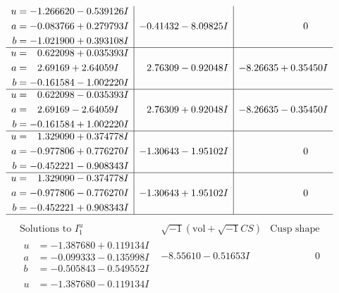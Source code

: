\documentclass[1p]{elsarticle_modified}
\theoremstyle{definition}
\newcommand{\I}{\sqrt{-1}}
\begin{document}
$$\begin{array}{c|c|c}
\begin{aligned}
u &= -1.266620 - 0.539126 I \\
a &= -0.083766 + 0.279793 I \\
b &= -1.021900 + 0.393108 I\end{aligned}
 & -0.41432 - 8.09825 I & \phantom{-0.000000 } 0 \\ \hline\begin{aligned}
u &= \phantom{-}0.622098 + 0.035393 I \\
a &= \phantom{-}2.69169 + 2.64059 I \\
b &= -0.161584 - 1.002220 I\end{aligned}
 & \phantom{-}2.76309 - 0.92048 I & -8.26635 + 0.35450 I \\ \hline\begin{aligned}
u &= \phantom{-}0.622098 - 0.035393 I \\
a &= \phantom{-}2.69169 - 2.64059 I \\
b &= -0.161584 + 1.002220 I\end{aligned}
 & \phantom{-}2.76309 + 0.92048 I & -8.26635 - 0.35450 I \\ \hline\begin{aligned}
u &= \phantom{-}1.329090 + 0.374778 I \\
a &= -0.977806 + 0.776270 I \\
b &= -0.452221 - 0.908343 I\end{aligned}
 & -1.30643 - 1.95102 I & \phantom{-0.000000 } 0 \\ \hline\begin{aligned}
u &= \phantom{-}1.329090 - 0.374778 I \\
a &= -0.977806 - 0.776270 I \\
b &= -0.452221 + 0.908343 I\end{aligned}
 & -1.30643 + 1.95102 I & \phantom{-0.000000 } 0\\
 \hline 
 \end{array}$$\newpage$$\begin{array}{c|c|c}  
\text{Solutions to }I^u_{1}& \I (\text{vol} + \sqrt{-1}CS) & \text{Cusp shape}\\
 \hline 
\begin{aligned}
u &= -1.387680 + 0.119134 I \\
a &= -0.099333 - 0.135998 I \\
b &= -0.505843 - 0.549552 I\end{aligned}
 & -8.55610 - 0.51653 I & \phantom{-0.000000 } 0 \\ \hline\begin{aligned}
u &= -1.387680 - 0.119134 I \\

\end{aligned}
\end{array}$$
\end{document}
